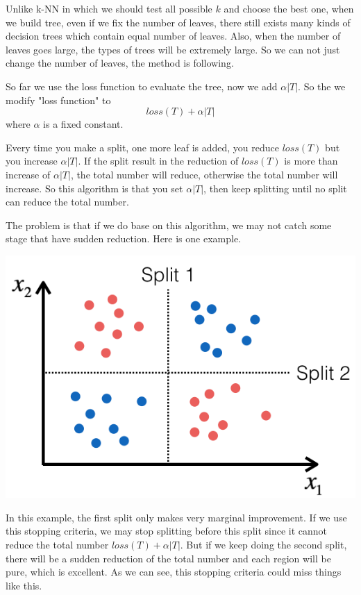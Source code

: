 \documentclass{article}
\begin{document}
{{	Unlike k-NN in which we should test all possible $k$ and choose the best one, when we build tree, even if we fix the number of leaves, there still exists many kinds of decision trees which contain equal number of leaves. Also, when the number of leaves goes large, the types of trees will be extremely large. So we can not just change the number of leaves, the method is following.
	
	So far we use the loss function to evaluate the tree, now we add $\alpha|T|$. So the we modify "loss function" to \[\mathit{loss}(T)+\alpha|T|\] 
where $\alpha$ is a fixed constant.

Every time you make a split, one more leaf is added, you reduce $\mathit{loss}(T)$ but you increase $\alpha|T|$. If the split result in the reduction of $\mathit{loss}(T)$ is more than increase of $\alpha|T|$, the total number will reduce, otherwise the total number will increase. So this algorithm is that you set $\alpha|T|$, then keep splitting until no split can reduce the total number.

The problem is that if we do base on this algorithm, we may not catch some stage that have sudden reduction. Here is one example.

 \begin{center}
 	\includegraphics[scale=0.65]{images/2split.png}
 \end{center}  

In this example, the first split only makes very marginal improvement. If we use this stopping criteria, we may stop splitting before this split since it cannot reduce the total number \(\mathit{loss}(T)+\alpha|T|\). But if we keep doing the second split, there will be a sudden reduction of the total number and each region will be pure, which is excellent. As we can see, this stopping criteria could miss things like this.

}}
\end{document}
